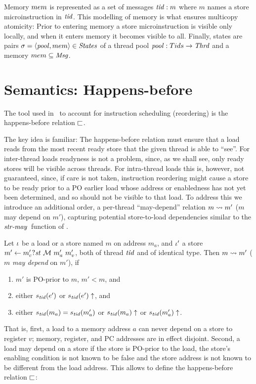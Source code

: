 Memory $\mem$ is represented as a set of messages $\tid:m$ where $m$ names a
store microinstruction in $\tid$. This modelling of memory is what ensures multicopy atomicity: Prior to entering memory a store microinstruction is visible only locally, and when it enters memory it becomes visible to all.
Finally, states are pairs $\state = \langle \thrdpool,\mem \rangle\in\States$ of a thread pool $\thrdpool : \Tids\rightarrow \Threads$ and a memory $\mem\subseteq\Msg$.

\section{Semantics: Happens-before}

The tool used in \MCMIL\ to account for instruction scheduling (reordering) is the happens-before relation $\hb$.

The key idea is familiar: The happens-before relation must ensure that a
load reads from the most recent ready store that the given thread is able to ``see''. For inter-thread loads readyness is not a problem, since, as we shall see, only ready stores will be visible across threads. For intra-thread loads this is, however, not guaranteed, since, if care is not taken, instruction reordering might cause a store to be ready prior to a PO earlier load whose address or enabledness has not yet been determined, and so should not be visible to that load. To address this we introduce an additional order, a per-thread ``may-depend'' relation $m\maydepend m'$ ($m$ may depend on $m'$), capturing potential store-to-load dependencies similar to the $\strmay$ function of \cite{MIL}.

\begin{definition}
Let $\inst$ be a load or a store named $m$ on address $m_a$, and $\inst'$ a store $\ass{m_c'}{m'}{\store{\memtype}{m_a'}{m_v'}}$, both of thread $\tid$ and of identical type. Then $m\maydepend m'$ ($m$ \emph{may depend} on $m'$), if
\begin{enumerate}
\item $m'$ is PO-prior to $m$, $m' < m$, and
\item either $\Val{\tid}{\expr'}$ or $\Val{\tid}{\expr'}\uparrow$, and
\item either
$\Val{\tid}{m_a}=\Val{\tid}{m_a'}$ or $\Val{\tid}{m_a}\uparrow$ or $\Val{\tid}{m_a'}\uparrow$.
\end{enumerate}
\end{definition}

That is, first, a load to a memory address $a$ can never depend on a
store to register $v$; memory, register, and PC addresses are in effect
disjoint. Second, a load may depend on a store if the store is PO-prior to the load, the store's enabling condition is not known to be false and the store address is not known to be different from the load address. 
This allows to define the happens-before relation $\hb$:

